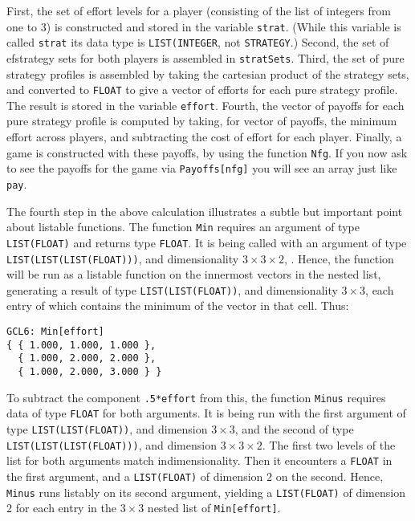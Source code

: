 First, the set of effort levels for a player (consisting of the list
of integers from one to 3) is constructed and stored in the variable
\verb+strat+.  (While this variable is called \verb+strat+ its data
type is \verb+LIST(INTEGER+, not \verb+STRATEGY+.)  Second, the set
of efstrategy sets for both players is assembled in \verb+stratSets+.
Third, the set of pure strategy profiles is assembled by taking the
cartesian product of the strategy sets, and converted to \verb+FLOAT+
to give a vector of efforts for each pure strategy profile.  The
result is stored in the variable \verb+effort+.  Fourth, the vector of
payoffs for each pure strategy profile is computed by taking, for
vector of payoffs, the minimum effort across players, and subtracting
the cost of effort for each player.  Finally, a game is constructed
with these payoffs, by using the function \verb+Nfg+.  If you now ask
to see the payoffs for the game via \verb+Payoffs[nfg]+ you will see
an array just like \verb+pay+.  

The fourth step in the above calculation illustrates a subtle but
important point about listable functions.  The function \verb+Min+
requires an argument of type \verb+LIST(FLOAT)+ and returns type
\verb+FLOAT+.  It is being called with an argument of type
\verb+LIST(LIST(LIST(FLOAT)))+, and dimensionality $3\times 3\times
2$, .  Hence, the function will be run as a listable function on the
innermost vectors in the nested list, generating a result of type
\verb+LIST(LIST(FLOAT))+, and dimensionality $3\times 3$, each entry
of which contains the minimum of the vector in that cell.  Thus:

\begin{verbatim}
GCL6: Min[effort]
{ { 1.000, 1.000, 1.000 },
  { 1.000, 2.000, 2.000 },
  { 1.000, 2.000, 3.000 } }
\end{verbatim}

\noindent
To subtract the component \verb+.5*effort+ from this, the function
\verb+Minus+ requires data of type \verb+FLOAT+ for both arguments.
It is being run with the first argument of type
\verb+LIST(LIST(FLOAT))+, and dimension $3\times 3$, and the second of
type \verb+LIST(LIST(LIST(FLOAT)))+, and dimension $3\times 3\times
2$.  The first two levels of the list for both arguments match
indimensionality.  Then it encounters a \verb+FLOAT+ in the first
argument, and a \verb+LIST(FLOAT)+ of dimension $2$ on the second.
Hence, \verb+Minus+ runs listably on its second argument, yielding a
\verb+LIST(FLOAT)+ of dimension $2$ for each entry in the $3\times 3$
nested list of \verb+Min[effort]+. 

